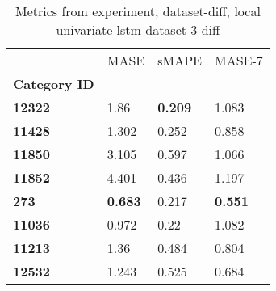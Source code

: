 \begin{table}[H]
\centering
\caption{Metrics from experiment, dataset-diff, local univariate lstm dataset 3 diff}
\label{table:local-univariate-lstm-dataset-3-diff-dataset-diff}
\begin{tabular}{llll}
\toprule
{} &            MASE &           sMAPE &          MASE-7 \\
\textbf{Category ID} &                 &                 &                 \\
\midrule
\textbf{12322      } &            1.86 &  \textbf{0.209} &           1.083 \\
\textbf{11428      } &           1.302 &           0.252 &           0.858 \\
\textbf{11850      } &           3.105 &           0.597 &           1.066 \\
\textbf{11852      } &           4.401 &           0.436 &           1.197 \\
\textbf{273        } &  \textbf{0.683} &           0.217 &  \textbf{0.551} \\
\textbf{11036      } &           0.972 &            0.22 &           1.082 \\
\textbf{11213      } &            1.36 &           0.484 &           0.804 \\
\textbf{12532      } &           1.243 &           0.525 &           0.684 \\
\bottomrule
\end{tabular}
\end{table}
